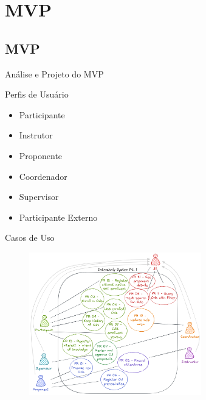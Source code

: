 
\section{MVP}
\subsection*{MVP}

\begin{frame}{{\sffamily Análise e Projeto do MVP}}
\begin{block}{Perfis de Usuário}
    \begin{itemize}
        \item Participante
        \item Instrutor
        \item Proponente
        \item Coordenador
        \item Supervisor
        
        \item Participante Externo
    \end{itemize}
\end{block}
\end{frame}

\begin{frame}{{\sffamily Casos de Uso}}
    \begin{figure}
        \vfill
        \includegraphics[width=7.5cm, ]{imagens/6-use-case-1.png}
        \vfill
    \end{figure}
\end{frame}

